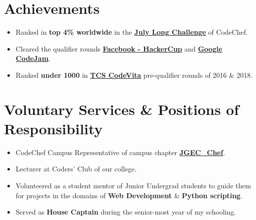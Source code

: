 \documentclass[margin, centered, a4paper]{res}
\begin{document}
\begin{resume}

\section{Achievements}
\begin{itemize}[leftmargin=*]
	\item
	Ranked in \textbf{top 4\% worldwide} in the \textbf{\href{https://www.codechef.com/JULY17}{July Long Challenge}} of CodeChef.
	\item
	Cleared the qualifier rounds \textbf{\href{https://www.facebook.com/hackercup/}{Facebook - HackerCup}} and \textbf{\href{https://codejam.withgoogle.com/codejam/}{Google CodeJam}}.
	\item
	Ranked \textbf{under 1000} in \textbf{\href{https://tcscodevita.com}{TCS CodeVita}} pre-qualifier rounds of 2016 \& 2018.


\end{itemize}

\section{Voluntary Services \& Positions of Responsibility}
\begin{itemize}[leftmargin=*]
	\item
	CodeChef Campus Representative of campus chapter \textbf{\href{https://www.codechef.com/campus_chapter/JGEC_Chef}{JGEC\_Chef}}.
	\item
	Lecturer at Coders' Club of our college.
	\item
	Volunteered as a student mentor of Junior Undergrad students to guide them for projects in the domains of \textbf{Web Development} \& \textbf{Python scripting}.
	\item
	Served as \textbf{House Captain} during the senior-most year of my schooling.
\end{itemize}


\end{resume}
\end{document}
